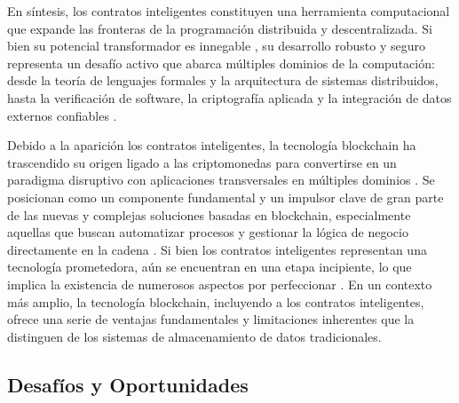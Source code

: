 En síntesis, los contratos inteligentes constituyen una herramienta computacional que expande las fronteras de la programación distribuida y descentralizada. Si bien su potencial transformador es innegable \cite{taherdoost2023smart}, su desarrollo robusto y seguro representa un desafío activo que abarca múltiples dominios de la computación: desde la teoría de lenguajes formales \cite{hoskinson2017we} y la arquitectura de sistemas distribuidos, hasta la verificación de software, la criptografía aplicada y la integración de datos externos confiables \cite{taherdoost2023smart}.

Debido a la aparición los contratos inteligentes, la tecnología blockchain ha trascendido su origen ligado a las criptomonedas para convertirse en un paradigma disruptivo con aplicaciones transversales en múltiples dominios \cite{bartolomeo2020introduccion, vaigandla2023review}. Se posicionan como un componente fundamental y un impulsor clave de gran parte de las nuevas y complejas soluciones basadas en blockchain, especialmente aquellas que buscan automatizar procesos y gestionar la lógica de negocio directamente en la cadena \cite{sharabati2024blockchain}. Si bien los contratos inteligentes representan una tecnología prometedora, aún se encuentran en una etapa incipiente, lo que implica la existencia de numerosos aspectos por perfeccionar \cite{taherdoost2023smart}. En un contexto más amplio, la tecnología blockchain, incluyendo a los contratos inteligentes, ofrece una serie de ventajas fundamentales y limitaciones inherentes que la distinguen de los sistemas de almacenamiento de datos tradicionales.

\subsection{Desafíos y Oportunidades}

